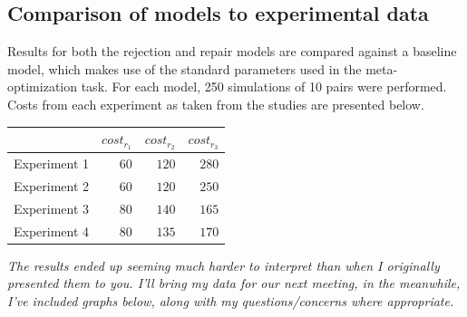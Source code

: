 \documentclass[12pt,a4paper]{article}
\begin{document}
\subsection{Comparison of models to experimental data}
Results for both the rejection and repair models are compared against a baseline model, which makes use of the standard parameters used in the meta-optimization task. For each model, 250 simulations of 10 pairs were performed. Costs from each experiment as taken from the \citeauthor{rohde2012} studies are presented below.
\begin{center}
    \begin{tabular}{ l r r r }
     & $cost_{r_1}$ & $cost_{r_2}$ & $cost_{r_3}$ \\ \hline
    Experiment 1 & $60$ & $120$ & $280$ \\ \hline
    Experiment 2 & $60$ & $120$ & $250$ \\ \hline
    Experiment 3 & $80$ & $140$ & $165$ \\ \hline
    Experiment 4 & $80$ & $135$ & $170$ \\ 
    \end{tabular}
\end{center}

\textit{The results ended up seeming much harder to interpret than when I originally presented them to you. I'll bring my data for our next meeting, in the meanwhile, I've included graphs below, along with my questions/concerns where appropriate.}
\end{document}
